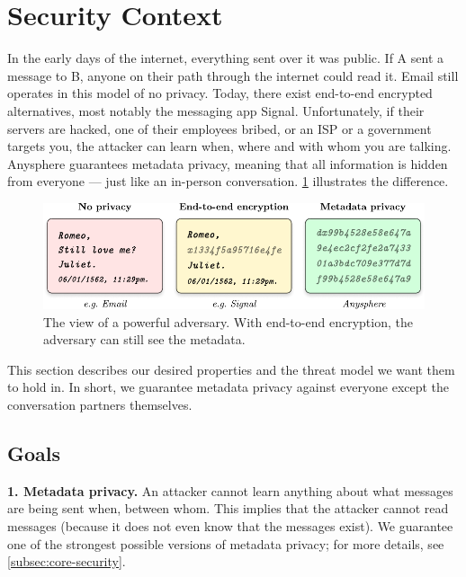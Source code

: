 \section{Security Context}
\label{sec:securitycontext}

In the early days of the internet, everything sent over it was public. If A sent a message to B, anyone on their path through the internet could read it. Email still operates in this model of no privacy. Today, there exist end-to-end encrypted alternatives, most notably the messaging app Signal. Unfortunately, if their servers are hacked, one of their employees bribed, or an ISP or a government targets you, the attacker can learn when, where and with whom you are talking. Anysphere guarantees metadata privacy, meaning that all information is hidden from everyone — just like an in-person conversation. \cref{fig:metadataprivacy} illustrates the difference.

\begin{figure}
    \centering
        \includegraphics[width=\textwidth]{metadata-privacy.pdf}
\caption{The view of a powerful adversary. With end-to-end encryption, the adversary can still see the metadata.}
\label{fig:metadataprivacy}
\end{figure}

This section describes our desired properties and the threat model we want them to hold in. In short, we guarantee metadata privacy against everyone except the conversation partners themselves.

\subsection{Goals}

\textbf{1. Metadata privacy.} An attacker cannot learn anything about what messages are being sent when, between whom. This implies that the attacker cannot read messages (because it does not even know that the messages exist). We guarantee one of the strongest possible versions of metadata privacy; for more details, see \cref{subsec:core-security}.

